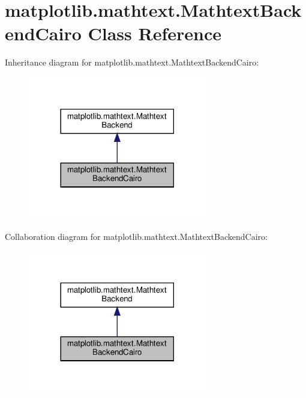 \hypertarget{classmatplotlib_1_1mathtext_1_1MathtextBackendCairo}{}\section{matplotlib.\+mathtext.\+Mathtext\+Backend\+Cairo Class Reference}
\label{classmatplotlib_1_1mathtext_1_1MathtextBackendCairo}


Inheritance diagram for matplotlib.\+mathtext.\+Mathtext\+Backend\+Cairo\+:
\nopagebreak
\begin{figure}[H]
\begin{center}
\leavevmode
\includegraphics[width=221pt]{classmatplotlib_1_1mathtext_1_1MathtextBackendCairo__inherit__graph}
\end{center}
\end{figure}


Collaboration diagram for matplotlib.\+mathtext.\+Mathtext\+Backend\+Cairo\+:
\nopagebreak
\begin{figure}[H]
\begin{center}
\leavevmode
\includegraphics[width=221pt]{classmatplotlib_1_1mathtext_1_1MathtextBackendCairo__coll__graph}
\end{center}
\end{figure}
